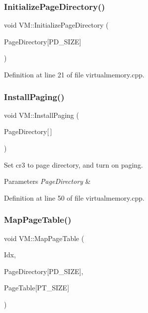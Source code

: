 \subsubsection{\texorpdfstring{Initialize\+Page\+Directory()}{InitializePageDirectory()}}
{\footnotesize\ttfamily void V\+M\+::\+Initialize\+Page\+Directory (\begin{DoxyParamCaption}\item[{uint32\+\_\+t}]{Page\+Directory\mbox{[}\+P\+D\+\_\+\+S\+I\+Z\+E\mbox{]} }\end{DoxyParamCaption})}



Definition at line 21 of file virtualmemory.\+cpp.

\mbox{\label{namespace_v_m_a9c0e1f32f8ec14ae7f246197e5b46498}} 
\subsubsection{\texorpdfstring{Install\+Paging()}{InstallPaging()}}
{\footnotesize\ttfamily void V\+M\+::\+Install\+Paging (\begin{DoxyParamCaption}\item[{const uint32\+\_\+t}]{Page\+Directory\mbox{[}$\,$\mbox{]} }\end{DoxyParamCaption})}



Set cr3 to page directory, and turn on paging. 


\begin{DoxyParams}{Parameters}
{\em Page\+Directory} & \\
\hline
\end{DoxyParams}


Definition at line 50 of file virtualmemory.\+cpp.

\mbox{\label{namespace_v_m_a23f571f0afcc986879a5d489ca0a2d4a}} 
\subsubsection{\texorpdfstring{Map\+Page\+Table()}{MapPageTable()}}
{\footnotesize\ttfamily void V\+M\+::\+Map\+Page\+Table (\begin{DoxyParamCaption}\item[{const size\+\_\+t}]{Idx,  }\item[{uint32\+\_\+t}]{Page\+Directory\mbox{[}\+P\+D\+\_\+\+S\+I\+Z\+E\mbox{]},  }\item[{uint32\+\_\+t}]{Page\+Table\mbox{[}\+P\+T\+\_\+\+S\+I\+Z\+E\mbox{]} }\end{DoxyParamCaption})}



